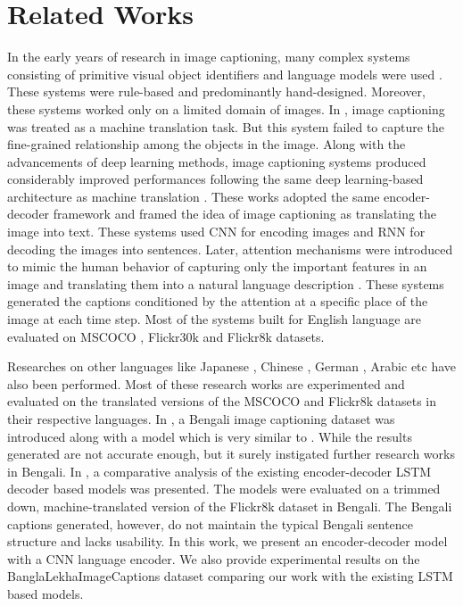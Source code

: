 \documentclass[runningheads]{llncs}
\begin{document}
\section{Related Works}
In the early years of research in image captioning, many complex systems consisting of primitive visual object identifiers and language models were used \cite{trafic_image}. These systems were rule-based and predominantly hand-designed. Moreover, these systems worked only on a limited domain of images. In \cite{ob_mt}, image captioning was treated as a machine translation task. But this system failed to capture the fine-grained relationship among the objects in the image. Along with the advancements of deep learning methods, image captioning systems produced considerably improved performances following the same deep learning-based architecture as machine translation \cite{mt1,mt2}. These works adopted the same encoder-decoder framework \cite{show&tell,donahue,dense_cap} and framed the idea of image captioning as translating the image into text. These systems used CNN for encoding images and RNN for decoding the images into sentences. Later, attention mechanisms were introduced to mimic the human behavior of capturing only the important features in an image and translating them into a natural language description \cite{show_attend&tell,sem_attn}. These systems generated the captions conditioned by the attention at a specific place of the image at each time step. Most of the systems built for English language are evaluated on MSCOCO \cite{mscoco}, Flickr30k \cite{flickr30k} and Flickr8k \cite{flickr8k} datasets. 

Researches on other languages like Japanese \cite{japanese}, Chinese \cite{chinese}, German \cite{german}, Arabic \cite{arabic} etc have also been performed. Most of these research works are experimented and evaluated on the translated versions of the MSCOCO \cite{mscoco} and Flickr8k \cite{flickr8k} datasets in their respective languages. In \cite{chittron}, a Bengali image captioning dataset \cite{BanglalekhaImageCaptions} was introduced along with a model which is very similar to \cite{show&tell}. While the results generated are not accurate enough, but it surely instigated further research works in Bengali. In \cite{oboyob}, a comparative analysis of the existing encoder-decoder LSTM decoder based models was presented. The models were evaluated on a trimmed down, machine-translated version of the Flickr8k \cite{flickr8k} dataset in Bengali. The Bengali captions generated, however, do not maintain the typical Bengali sentence structure and lacks usability. In this work, we present an encoder-decoder model with a CNN language encoder. We also provide experimental results on the BanglaLekhaImageCaptions dataset comparing our work with the existing LSTM based models.
\end{document}

